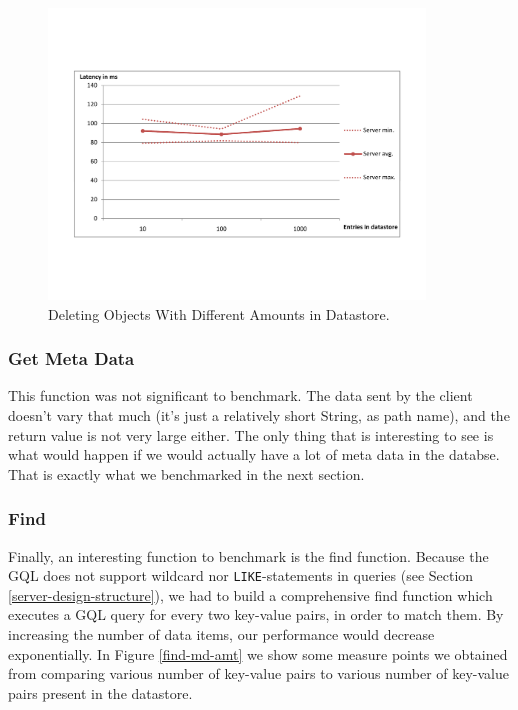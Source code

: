 \begin{figure} %
\begin{center}
\includegraphics[trim=5cm 4cm 5cm 5cm,width=10cm]{./figures/del_amt.pdf}
\caption{Deleting Objects With Different Amounts in Datastore.
\label{del-obj-amt}}
\end{center}
\end{figure}

\subsubsection{Get Meta Data}
This function was not significant to benchmark. The data sent by the client
doesn't vary that much (it's just a relatively short String, as path name), and
the return value is not very large either. The only thing that is interesting
to see is what would happen if we would actually have a lot of meta data in the
databse. That is exactly what we benchmarked in the next section.

\subsubsection{Find}
Finally, an interesting function to benchmark is the find function. Because the
GQL does not support wildcard nor \texttt{LIKE}-statements in queries (see
Section \ref{server-design-structure}), we had to build a comprehensive find
function which executes a GQL query for every two key-value pairs, in order to
match them. By increasing the number of data items, our performance would
decrease exponentially. In Figure \ref{find-md-amt} we show some measure points
we obtained from comparing various number of key-value pairs to various number
of key-value pairs present in the datastore.

